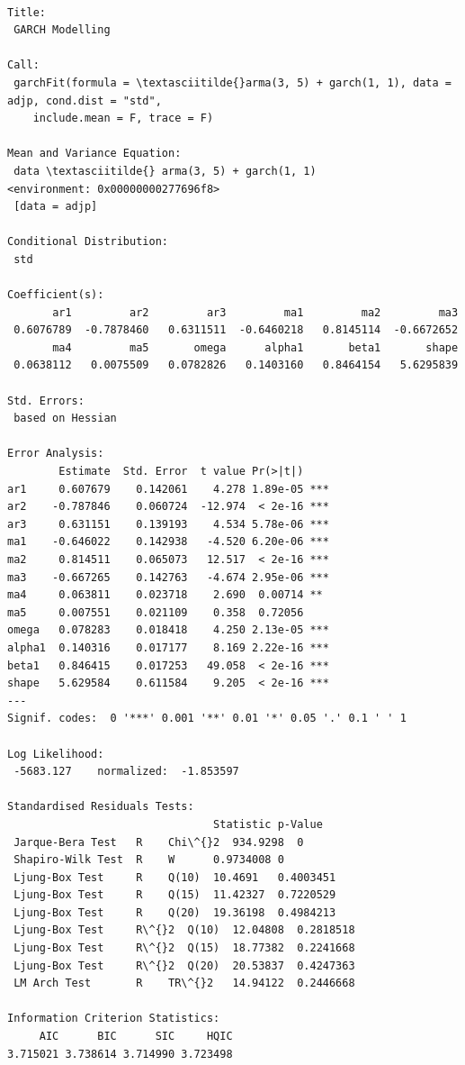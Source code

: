 \documentclass[11pt]{article}
\begin{document}
    \begin{Verbatim}[commandchars=\\\{\}]

Title:
 GARCH Modelling

Call:
 garchFit(formula = \textasciitilde{}arma(3, 5) + garch(1, 1), data = adjp, cond.dist = "std",
    include.mean = F, trace = F)

Mean and Variance Equation:
 data \textasciitilde{} arma(3, 5) + garch(1, 1)
<environment: 0x00000000277696f8>
 [data = adjp]

Conditional Distribution:
 std

Coefficient(s):
       ar1         ar2         ar3         ma1         ma2         ma3
 0.6076789  -0.7878460   0.6311511  -0.6460218   0.8145114  -0.6672652
       ma4         ma5       omega      alpha1       beta1       shape
 0.0638112   0.0075509   0.0782826   0.1403160   0.8464154   5.6295839

Std. Errors:
 based on Hessian

Error Analysis:
        Estimate  Std. Error  t value Pr(>|t|)
ar1     0.607679    0.142061    4.278 1.89e-05 ***
ar2    -0.787846    0.060724  -12.974  < 2e-16 ***
ar3     0.631151    0.139193    4.534 5.78e-06 ***
ma1    -0.646022    0.142938   -4.520 6.20e-06 ***
ma2     0.814511    0.065073   12.517  < 2e-16 ***
ma3    -0.667265    0.142763   -4.674 2.95e-06 ***
ma4     0.063811    0.023718    2.690  0.00714 **
ma5     0.007551    0.021109    0.358  0.72056
omega   0.078283    0.018418    4.250 2.13e-05 ***
alpha1  0.140316    0.017177    8.169 2.22e-16 ***
beta1   0.846415    0.017253   49.058  < 2e-16 ***
shape   5.629584    0.611584    9.205  < 2e-16 ***
---
Signif. codes:  0 '***' 0.001 '**' 0.01 '*' 0.05 '.' 0.1 ' ' 1

Log Likelihood:
 -5683.127    normalized:  -1.853597

Standardised Residuals Tests:
                                Statistic p-Value
 Jarque-Bera Test   R    Chi\^{}2  934.9298  0
 Shapiro-Wilk Test  R    W      0.9734008 0
 Ljung-Box Test     R    Q(10)  10.4691   0.4003451
 Ljung-Box Test     R    Q(15)  11.42327  0.7220529
 Ljung-Box Test     R    Q(20)  19.36198  0.4984213
 Ljung-Box Test     R\^{}2  Q(10)  12.04808  0.2818518
 Ljung-Box Test     R\^{}2  Q(15)  18.77382  0.2241668
 Ljung-Box Test     R\^{}2  Q(20)  20.53837  0.4247363
 LM Arch Test       R    TR\^{}2   14.94122  0.2446668

Information Criterion Statistics:
     AIC      BIC      SIC     HQIC
3.715021 3.738614 3.714990 3.723498

    \end{Verbatim}
\end{document}
